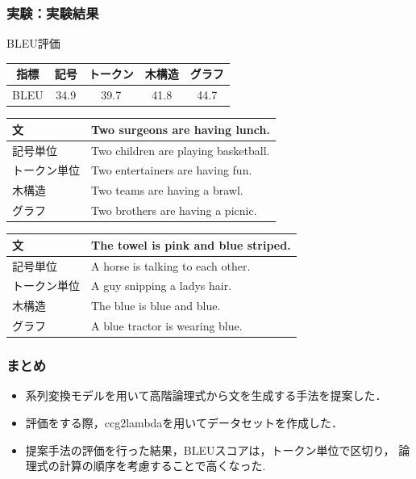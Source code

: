\documentclass[dvipdfmx,cjk]{beamer}
\begin{document}
\begin{frame}
\frametitle{実験：実験結果}
\begin{block}{BLEU評価}
  \label{table:evaluation}
  \centering
  \begin{tabular}{ccccc}
    \hline
    指標  & 記号 & トークン & 木構造 & グラフ \\
    \hline \hline
    BLEU  & 34.9   & 39.7 & 41.8  & 44.7\\
    \hline
  \end{tabular}
\label{sec:result}
\end{block}
\begin{table}[h]
\centering
\begin{tabular}{ll} \hline
文 & Two surgeons are having lunch. \\ \hline
記号単位 & Two children are playing basketball.\\
トークン単位 & Two entertainers are having fun.\\
木構造 & Two teams are having a brawl.\\
グラフ & Two brothers are having a picnic.\\ \hline
\end{tabular}
\label{tab:example1}
\end{table}
\begin{table}[h]
\centering
\begin{tabular}{ll} \hline
文 & The towel is pink and blue striped. \\ \hline
記号単位 & A horse is talking to each other.\\
トークン単位 & A guy snipping a ladys hair.\\
木構造 & The blue is blue and blue.\\
グラフ & A blue tractor is wearing blue.\\ \hline
\end{tabular}
\label{tab:example2}
\end{table}
\end{frame}

\begin{frame}
\frametitle{まとめ}
\begin{itemize}
\item 系列変換モデルを用いて高階論理式から文を生成する手法を提案した．
\item 評価をする際，ccg2lambdaを用いてデータセットを作成した．
\item 提案手法の評価を行った結果，BLEUスコアは，トークン単位で区切り，
論理式の計算の順序を考慮することで高くなった.
\end{itemize}

\end{frame}
\end{document}

